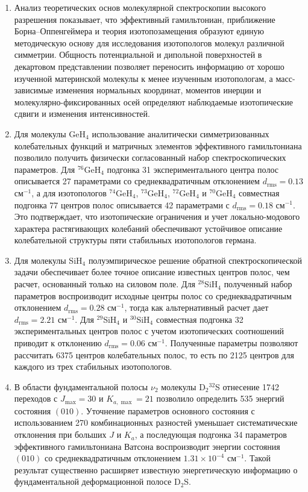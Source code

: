 \begin{enumerate}
  \item Анализ теоретических основ молекулярной спектроскопии высокого разрешения показывает, что
  эффективный гамильтониан, приближение Борна--Оппенгеймера и теория изотопозамещения образуют
  единую методическую основу для исследования изотопологов молекул различной симметрии. Общность
  потенциальной и дипольной поверхностей в декартовом представлении позволяет переносить информацию от
  хорошо изученной материнской молекулы к менее изученным изотопологам, а масс-зависимые изменения
  нормальных координат, моментов инерции и молекулярно-фиксированных осей определяют наблюдаемые
  изотопические сдвиги и изменения интенсивностей.

  \item Для молекулы GeH$_4$ использование аналитически симметризованных колебательных функций и
  матричных элементов эффективного гамильтониана позволило получить физически согласованный набор
  спектроскопических параметров. Для ${}^{76}$GeH$_4$ подгонка 31 экспериментального центра полос
  описывается 27 параметрами со среднеквадратичным отклонением $d_{\textrm{rms}}=0.13$ см$^{-1}$, а для
  изотопологов ${}^{74}$GeH$_4$, ${}^{73}$GeH$_4$, ${}^{72}$GeH$_4$ и ${}^{70}$GeH$_4$ совместная подгонка
  77 центров полос описывается 42 параметрами с $d_{\textrm{rms}}=0.18$ см$^{-1}$. Это подтверждает, что
  изотопические ограничения и учет локально-модового характера растягивающих колебаний обеспечивают
  устойчивое описание колебательной структуры пяти стабильных изотопологов германа.

  \item Для молекулы SiH$_4$ полуэмпирическое решение обратной спектроскопической задачи обеспечивает
  более точное описание известных центров полос, чем расчет, основанный только на силовом поле. Для
  ${}^{28}$SiH$_4$ полученный набор параметров воспроизводит исходные центры полос со
  среднеквадратичным отклонением $d_{\textrm{rms}}=0.28$ см$^{-1}$, тогда как альтернативный расчет дает
  $d_{\textrm{rms}}=2.21$ см$^{-1}$. Для ${}^{29}$SiH$_4$ и ${}^{30}$SiH$_4$ совместная подгонка 32
  экспериментальных центров полос с учетом изотопических соотношений приводит к отклонению
  $d_{\textrm{rms}}=0.06$ см$^{-1}$. Полученные параметры позволяют рассчитать 6375 центров
  колебательных полос, то есть по 2125 центров для каждого из трех стабильных изотопологов.

  \item В области фундаментальной полосы $\nu_2$ молекулы D$_2{}^{32}$S отнесение 1742 переходов с
  $J_{\max}=30$ и $K_{a,\max}=21$ позволило определить 535 энергий состояния $(010)$. Уточнение
  параметров основного состояния с использованием 270 комбинационных разностей уменьшает систематические
  отклонения при больших $J$ и $K_a$, а последующая подгонка 34 параметров эффективного гамильтониана
  Ватсона воспроизводит энергии состояния $(010)$ со среднеквадратичным отклонением
  $1.31\times10^{-4}$ см$^{-1}$. Такой результат существенно расширяет известную энергетическую
  информацию о фундаментальной деформационной полосе D$_2$S.


\end{enumerate}
